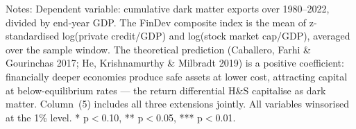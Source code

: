 \documentclass[11pt]{article}
\begin{document}
\begin{table}[htbp]
{}
\begin{minipage}{0.95\linewidth}
\footnotesize Notes: Dependent variable: cumulative dark matter exports over 1980--2022, divided by end-year GDP. The FinDev composite index is the mean of z-standardised log(private credit/GDP) and log(stock market cap/GDP), averaged over the sample window. The theoretical prediction (Caballero, Farhi \& Gourinchas 2017; He, Krishnamurthy \& Milbradt 2019) is a positive coefficient: financially deeper economies produce safe assets at lower cost, attracting capital at below-equilibrium rates --- the return differential H\&S capitalise as dark matter. Column~(5) includes all three extensions jointly. All variables winsorised at the 1\% level. * p$<$0.10, ** p$<$0.05, *** p$<$0.01.
\end{minipage}
\end{table}
\end{document}
